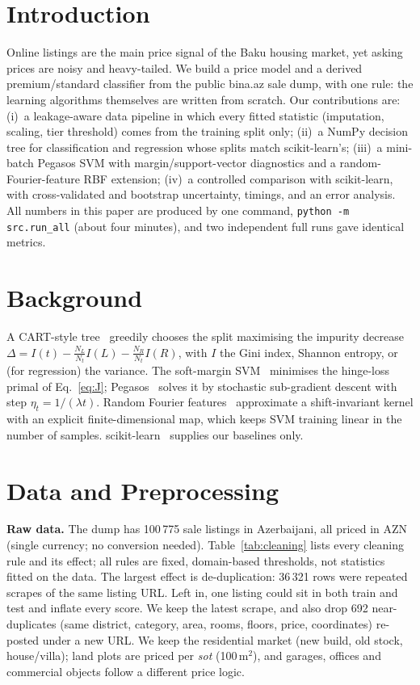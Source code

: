 \documentclass[10pt,twocolumn,a4paper]{article}
\begin{document}
\section{Introduction}
Online listings are the main price signal of the Baku housing market, yet asking prices are noisy and heavy-tailed.
We build a price model and a derived premium/standard classifier from the public bina.az sale dump, with one rule: the
learning algorithms themselves are written from scratch. Our contributions are:
(i)~a leakage-aware data pipeline in which every fitted statistic (imputation, scaling, tier threshold) comes from the
training split only;
(ii)~a NumPy decision tree for classification and regression whose splits match scikit-learn's;
(iii)~a mini-batch Pegasos SVM with margin/support-vector diagnostics and a random-Fourier-feature RBF extension;
(iv)~a controlled comparison with scikit-learn, with cross-validated and bootstrap uncertainty, timings, and an error analysis.
All numbers in this paper are produced by one command, \texttt{python -m src.run\_all} (about four minutes), and two
independent full runs gave identical metrics.

\section{Background}
A CART-style tree~\cite{cart} greedily chooses the split maximising the impurity decrease
$\Delta=I(t)-\tfrac{N_L}{N_t}I(L)-\tfrac{N_R}{N_t}I(R)$,
with $I$ the Gini index, Shannon entropy, or (for regression) the variance. The soft-margin SVM~\cite{svm} minimises the
hinge-loss primal of Eq.~\eqref{eq:J}; Pegasos~\cite{pegasos} solves it by stochastic sub-gradient descent with step
$\eta_t=1/(\lambda t)$. Random Fourier features~\cite{rff} approximate a shift-invariant kernel with an explicit finite-dimensional
map, which keeps SVM training linear in the number of samples. scikit-learn~\cite{sklearn} supplies our baselines only.

\section{Data and Preprocessing}
\textbf{Raw data.} The dump has 100\,775 sale listings in Azerbaijani, all priced in AZN (single currency; no conversion needed).
Table~\ref{tab:cleaning} lists every cleaning rule and its effect; all rules are fixed, domain-based thresholds,
not statistics fitted on the data. The largest effect is de-duplication: 36\,321 rows were repeated scrapes of the same listing URL.
Left in, one listing could sit in both train and test and inflate every score. We keep the latest scrape, and also drop 692
near-duplicates (same district, category, area, rooms, floors, price, coordinates) re-posted under a new URL.
We keep the residential market (new build, old stock, house/villa); land plots are priced per \emph{sot} (100\,m$^2$),
and garages, offices and commercial objects follow a different price logic.
\end{document}
